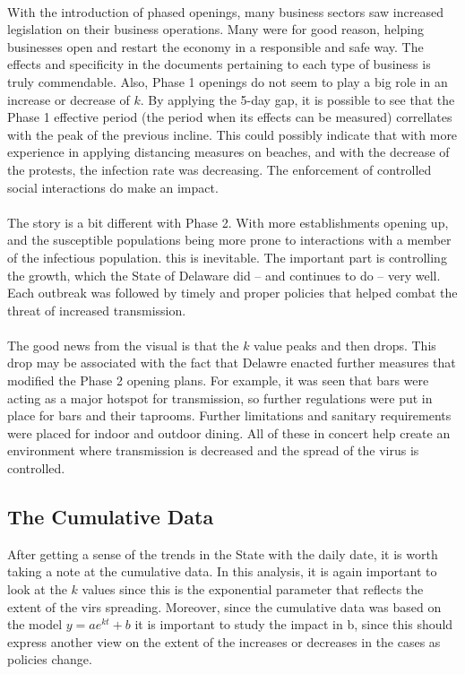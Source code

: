 \documentclass[12pt]{article}
\begin{document}
\paragraph{} With the introduction of phased openings, many business sectors saw increased legislation on their business operations. Many were for good reason, helping businesses open and restart the economy in a responsible and safe way. The effects and specificity in the documents pertaining to each type of business is truly commendable. Also, Phase 1 openings do not seem to play a big role in an increase or decrease of $k$. By applying the 5-day gap, it is possible to see that the Phase 1 effective period (the period when its effects can be measured) correllates with the peak of the previous incline. This could possibly indicate that with more experience in applying distancing measures on beaches, and with the decrease of the protests, the infection rate was decreasing. The enforcement of controlled social interactions do make an impact.

\paragraph{} The story is a bit different with Phase 2. With more establishments opening up, and the susceptible populations being more prone to interactions with a member of the infectious population. this is inevitable. The important part is controlling the growth, which the State of Delaware did -- and continues to do -- very well. Each outbreak was followed by timely and proper policies that helped combat the threat of increased transmission.

\paragraph{} The good news from the visual is that the $k$ value peaks and then drops. This drop may be associated with the fact that Delawre enacted further measures that modified the Phase 2 opening plans. For example, it was seen that bars were acting as a major hotspot for transmission, so further regulations were put in place for bars and their taprooms. Further limitations and sanitary requirements were placed for indoor and outdoor dining. All of these in concert help create an environment where transmission is decreased and the spread of the virus is controlled.


\subsection{The Cumulative Data}
After getting a sense of the trends in the State with the daily date, it is worth taking a note at the cumulative data. In this analysis, it is again important to look at the $k$ values since this is the exponential parameter that reflects the extent of the virs spreading. Moreover, since the cumulative data was based on the model $y=ae^{kt} +b$ it is important to study the impact in b, since this should express another view on the extent of the increases or decreases in the cases as policies change.
\end{document}

